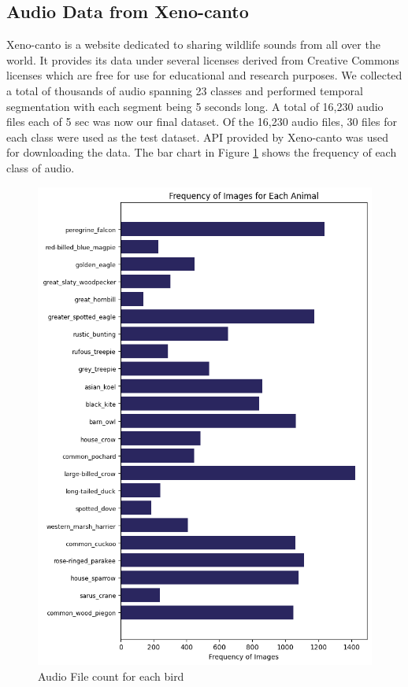 \documentclass[fleqn, 10pt, twoside]{IOEGC}
\begin{document}
\subsection{Audio Data from Xeno-canto}
Xeno-canto is a website dedicated to sharing wildlife sounds from all over the world. It provides its data under several licenses derived from Creative Commons licenses which are free for use for educational and research purposes. We collected a total of thousands of audio spanning 23 classes and performed temporal segmentation with each segment being 5 seconds long. A total of 16,230 audio files each of 5 sec was now our final dataset. Of the 16,230 audio files, 30 files for each class were used as the test dataset.
API provided by Xeno-canto was used for downloading the data. The bar chart in Figure \ref{audio-file-count-bird} shows the frequency of each class of audio.

	{

		\begin{figure}
			\centering
			\includegraphics[scale=0.5]{Graphics/xenocanto.png}
			\caption{Audio File count for each bird}
			\label{audio-file-count-bird}
		\end{figure}

	}
\end{document}

